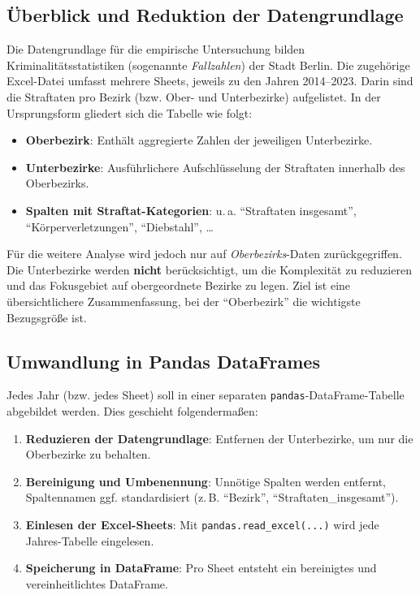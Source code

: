 \documentclass[11pt,a4paper]{article}
\begin{document}
\subsection{Überblick und Reduktion der Datengrundlage}
Die Datengrundlage für die empirische Untersuchung bilden Kriminalitätsstatistiken (sogenannte \emph{Fallzahlen}) der Stadt Berlin\cite{opendataberlin}. Die zugehörige Excel-Datei umfasst mehrere Sheets, jeweils zu den Jahren 2014--2023. Darin sind die Straftaten pro Bezirk (bzw. Ober- und Unterbezirke) aufgelistet. In der Ursprungsform gliedert sich die Tabelle wie folgt:
\begin{itemize}
    \item \textbf{Oberbezirk}: Enthält aggregierte Zahlen der jeweiligen Unterbezirke.
    \item \textbf{Unterbezirke}: Ausführlichere Aufschlüsselung der Straftaten innerhalb des Oberbezirks.
    \item \textbf{Spalten mit Straftat-Kategorien}: u.\,a. \enquote{Straftaten insgesamt}, \enquote{Körperverletzungen}, \enquote{Diebstahl}, \dots
\end{itemize}

Für die weitere Analyse wird jedoch nur auf \emph{Oberbezirks}-Daten zurückgegriffen. Die Unterbezirke werden \textbf{nicht} berücksichtigt, um die Komplexität zu reduzieren und das Fokusgebiet auf obergeordnete Bezirke zu legen. Ziel ist eine übersichtlichere Zusammenfassung, bei der \enquote{Oberbezirk} die wichtigste Bezugsgröße ist.

\subsection{Umwandlung in Pandas DataFrames}
Jedes Jahr (bzw. jedes Sheet) soll in einer separaten \texttt{pandas}-DataFrame-Tabelle abgebildet werden. Dies geschieht folgendermaßen:
\begin{enumerate}
    \item \textbf{Reduzieren der Datengrundlage}: Entfernen der Unterbezirke, um nur die Oberbezirke zu behalten.
    \item \textbf{Bereinigung und Umbenennung}: Unnötige Spalten werden entfernt, Spaltennamen ggf. standardisiert (z.\,B. \enquote{Bezirk}, \enquote{Straftaten\_insgesamt}).
    \item \textbf{Einlesen der Excel-Sheets}: Mit \texttt{pandas.read\_excel(...)} wird jede Jahres-Tabelle eingelesen.
    \item \textbf{Speicherung in DataFrame}: Pro Sheet entsteht ein bereinigtes und vereinheitlichtes DataFrame.
\end{enumerate}
\end{document}
